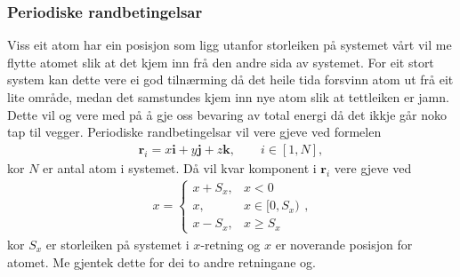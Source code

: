 \documentclass[12pt, a4paper]{article}
\theoremstyle{definition} \newtheorem*{definition}{Teorem}
\newcommand{\vb}{\mathbf}
\begin{document}
        \subsubsection*{Periodiske randbetingelsar}
            Viss eit atom har ein 
            posisjon som ligg utanfor storleiken på systemet vårt vil me flytte atomet slik at det kjem inn frå den andre sida av systemet. For eit stort system kan dette 
            vere ei god tilnærming då det heile tida forsvinn atom ut frå eit lite område, medan det samstundes kjem inn nye atom slik at tettleiken er jamn. Dette vil og vere med
            på å gje oss bevaring av total energi då det ikkje går noko tap til vegger. Periodiske randbetingelsar vil vere gjeve ved formelen
            \begin{align*}
                \vb{r}_i = x\vb{i} + y\vb{j} + z\vb{k}, \qquad i \in [1, N],
            \end{align*}
            kor $N$ er antal atom i systemet. Då vil kvar komponent i $\vb{r}_i$ vere gjeve ved
            \begin{align*}
                x = 
                \begin{cases}
                    x + S_x, & x < 0 \\
                    x, & x \in [0, S_x) \\
                    x - S_x, & x \geq S_x
                \end{cases},
            \end{align*}
            kor $S_x$ er storleiken på systemet i $x$-retning og $x$ er noverande posisjon for atomet. Me gjentek dette for dei to andre retningane og.
\end{document}
